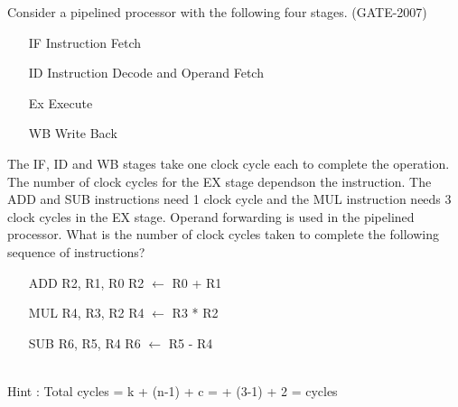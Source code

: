 \begin{questyle}
  \question  Consider a pipelined processor with the following four stages. (GATE-2007)

  \begin{enumerate}
    \item[IF] Instruction Fetch
    \item[ID] Instruction Decode and Operand Fetch
    \item[Ex] Execute
    \item[WB] Write Back
  \end{enumerate}
  The IF, ID and WB stages take one clock cycle each to complete the operation. The number of clock
  cycles for the EX stage dependson the instruction. The ADD and SUB instructions need 1 clock cycle
  and the MUL instruction needs 3 clock cycles in the EX stage. Operand forwarding is used in the
  pipelined processor. What is the number of clock cycles taken to complete the following
  sequence of instructions?

  \begin{enumerate}
    \item[ADD] R2, R1, R0 \qquad R2 \(\leftarrow\) R0 + R1
    \item[MUL] R4, R3, R2 \qquad R4 \(\leftarrow\) R3 * R2
    \item[SUB] R6, R5, R4 \qquad R6 \(\leftarrow\) R5 - R4
  \end{enumerate}

  \begin{oneparchoices}
  \end{oneparchoices} \\
  Hint : Total cycles  = \quad k + (n-1) + c =  + (3-1) + 2 =  cycles
\end{questyle}


